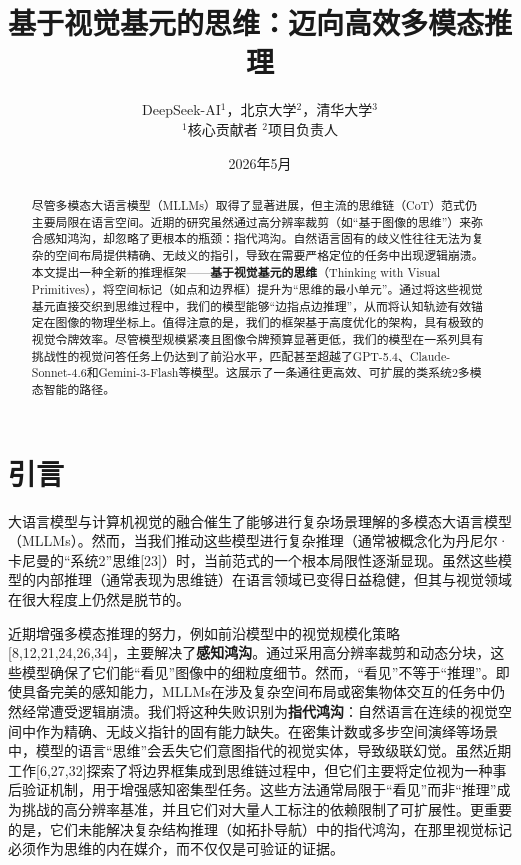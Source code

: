 \documentclass[11pt,a4paper]{article}
\title{\textbf{基于视觉基元的思维：迈向高效多模态推理}}
\author{DeepSeek-AI$^1$，北京大学$^2$，清华大学$^3$ \\ $^1$核心贡献者 $^2$项目负责人}
\date{2026年5月}
\begin{document}
\maketitle

\begin{abstract}
尽管多模态大语言模型（MLLMs）取得了显著进展，但主流的思维链（CoT）范式仍主要局限在语言空间。近期的研究虽然通过高分辨率裁剪（如“基于图像的思维”）来弥合感知鸿沟，却忽略了更根本的瓶颈：指代鸿沟。自然语言固有的歧义性往往无法为复杂的空间布局提供精确、无歧义的指引，导致在需要严格定位的任务中出现逻辑崩溃。本文提出一种全新的推理框架——\textbf{基于视觉基元的思维}（Thinking with Visual Primitives），将空间标记（如点和边界框）提升为“思维的最小单元”。通过将这些视觉基元直接交织到思维过程中，我们的模型能够“边指点边推理”，从而将认知轨迹有效锚定在图像的物理坐标上。值得注意的是，我们的框架基于高度优化的架构，具有极致的视觉令牌效率。尽管模型规模紧凑且图像令牌预算显著更低，我们的模型在一系列具有挑战性的视觉问答任务上仍达到了前沿水平，匹配甚至超越了GPT-5.4、Claude-Sonnet-4.6和Gemini-3-Flash等模型。这展示了一条通往更高效、可扩展的类系统2多模态智能的路径。
\end{abstract}

\section{引言}

大语言模型与计算机视觉的融合催生了能够进行复杂场景理解的多模态大语言模型（MLLMs）。然而，当我们推动这些模型进行复杂推理（通常被概念化为丹尼尔·卡尼曼的“系统2”思维[23]）时，当前范式的一个根本局限性逐渐显现。虽然这些模型的内部推理（通常表现为思维链）在语言领域已变得日益稳健，但其与视觉领域在很大程度上仍然是脱节的。

近期增强多模态推理的努力，例如前沿模型中的视觉规模化策略[8,12,21,24,26,34]，主要解决了\textbf{感知鸿沟}。通过采用高分辨率裁剪和动态分块，这些模型确保了它们能“看见”图像中的细粒度细节。然而，“看见”不等于“推理”。即使具备完美的感知能力，MLLMs在涉及复杂空间布局或密集物体交互的任务中仍然经常遭受逻辑崩溃。我们将这种失败识别为\textbf{指代鸿沟}：自然语言在连续的视觉空间中作为精确、无歧义指针的固有能力缺失。在密集计数或多步空间演绎等场景中，模型的语言“思维”会丢失它们意图指代的视觉实体，导致级联幻觉。虽然近期工作[6,27,32]探索了将边界框集成到思维链过程中，但它们主要将定位视为一种事后验证机制，用于增强感知密集型任务。这些方法通常局限于“看见”而非“推理”成为挑战的高分辨率基准，并且它们对大量人工标注的依赖限制了可扩展性。更重要的是，它们未能解决复杂结构推理（如拓扑导航）中的指代鸿沟，在那里视觉标记必须作为思维的内在媒介，而不仅仅是可验证的证据。
\end{document}
